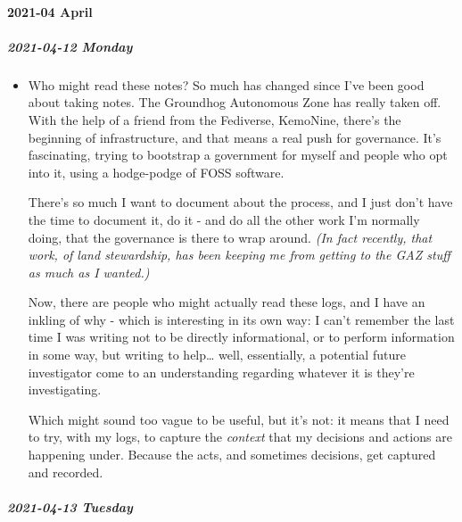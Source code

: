 \documentclass[11pt]{article}
\begin{document}
\paragraph*{2021-04 April}
\label{sec:org14085b2}
\startcontents[level-4]
\subparagraph*{2021-04-12 Monday}
\label{sec:orgf54c67e}
\begin{itemize}
\item Who might read these notes?
\label{sec:org72201bd}
So much has changed since I've been good about taking notes. The Groundhog Autonomous Zone has really taken off. With the help of a friend from the Fediverse, KemoNine, there's the beginning of infrastructure, and that means a real push for governance. It's fascinating, trying to bootstrap a government for myself and people who opt into it, using a hodge-podge of FOSS software.

There's so much I want to document about the process, and I just don't have the time to document it, do it - and do all the other work I'm normally doing, that the governance is there to wrap around. \emph{(In fact recently, that work, of land stewardship, has been keeping me from getting to the GAZ stuff as much as I wanted.)}

Now, there are people who might actually read these logs, and I have an inkling of why - which is interesting in its own way: I can't remember the last time I was writing not to be directly informational, or to perform information in some way, but writing to help\ldots{} well, essentially, a potential future investigator come to an understanding regarding whatever it is they're investigating.

Which might sound too vague to be useful, but it's not: it means that I need to try, with my logs, to capture the \emph{context} that my decisions and actions are happening under. Because the acts, and sometimes decisions, get captured and recorded.
\end{itemize}
\subparagraph*{2021-04-13 Tuesday}
\label{sec:org5ca9c92}
\end{document}
